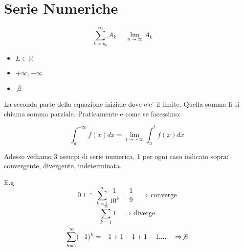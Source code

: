 \documentclass{article}
\begin{document}
          \section{Serie Numeriche}
          \begin{equation*}
            \sum_{k=k_0}^{\infty} A_k= \lim_{n \to \infty} A_k=
          \end{equation*}
          \begin{itemize}
            \item $L\in \mathbb{R}$
            \item $+\infty,-\infty$
            \item $\not \exists$
          \end{itemize}
          \begin{flushleft}
            La seconda parte della equazione iniziale dove c'e' il limite. Quella somma li si chiama somma parziale. Praticamente
            e come se facessimo:
          \end{flushleft}
          \begin{equation*}
            \int^{+\infty}_a f(x)dx=\lim_{t \to +\infty} \int^t_a f(x)dx
          \end{equation*}
          \begin{flushleft}
           Adesso vediamo 3 esempi di serie numerica, 1 per ogni caso indicato sopra: convergente, divergente, indeterminata. 
          \end{flushleft}
          E.g
          \begin{equation*}
            0.1\bar=\sum^{\infty}_{k=1} \frac{1}{10^k}=\frac{1}{9} \quad \Rightarrow \text{converge}
          \end{equation*}
          \begin{equation*}
            \sum^{\infty}_{k=1} 1 \quad \Rightarrow \text{diverge}
          \end{equation*}
          \begin{equation*}
            \sum^{\infty}_{k=1} (-1)^k=-1+1-1+1-1.... \quad \Rightarrow \not \exists
          \end{equation*}
\end{document}
